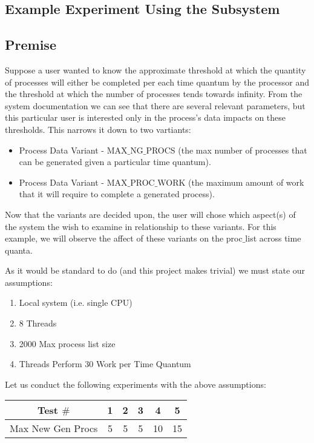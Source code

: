 \documentclass[acmsmall]{acmart}
\begin{document}
\begin{multicols}{2}
\section{Example Experiment Using the Subsystem}
  \subsection{Premise}
    Suppose a user wanted to know the approximate threshold at which the
    quantity of processes will either be completed per each time quantum by the
    processor and the threshold at which the number of processes tends towards
    infinity. From the system documentation we can see that there are several
    relevant parameters, but this particular user is interested only in the
    process's data impacts on these thresholds.  This narrows it down to two
    vartiants:
    \begin{itemize}
      \item Process Data Variant - MAX$\_$NG$\_$PROCS (the max number of
        processes that can be generated given a particular time quantum).
      \item Process Data Variant - MAX$\_$PROC$\_$WORK (the maximum amount of
        work that it will require to complete a generated process).
    \end{itemize}
    Now that the variants are decided upon, the user will chose which aspect(s)
    of the system the wish to examine in relationship to these variants. For
    this example, we will observe the affect of these variants on the
    proc$\_$list across time quanta.
    \par
    As it would be standard to do (and this project makes trivial) we must state
    our assumptions:
    \begin{enumerate}
      \item Local system (i.e. single CPU)
      \item 8 Threads
      \item 2000 Max process list size
      \item Threads Perform 30 Work per Time Quantum
    \end{enumerate}
    Let us conduct the following experiments with the above assumptions:
    \par
    \begin{tabular}{|c|ccccc|}
      \hline
      Test $\#$         & 1  & 2  & 3  & 4  & 5 \\
      \hline
      Max New Gen Procs & 5  & 5  & 5  & 10 & 15 \\

\end{tabular}
\end{multicols}
\end{document}
